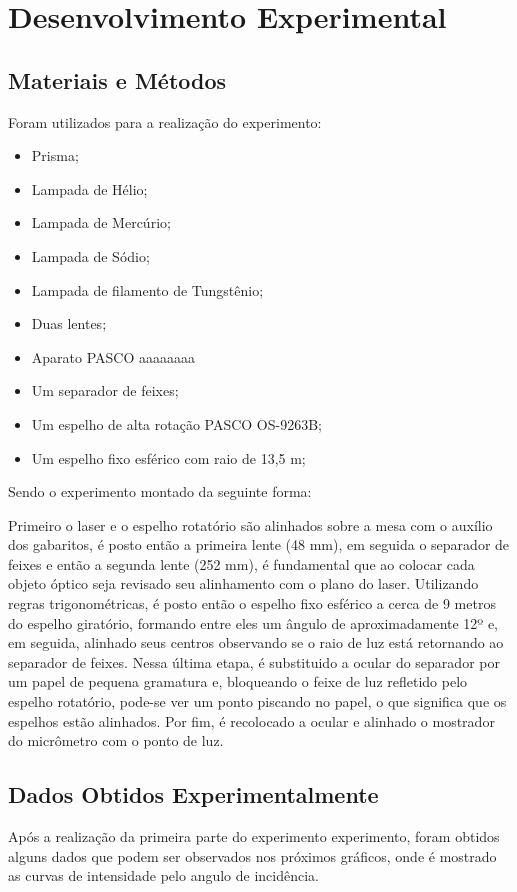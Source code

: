 \section{Desenvolvimento Experimental}
\subsection{Materiais e Métodos}
Foram utilizados para a realização do experimento:
\begin{itemize}
	\item Prisma;
	\item Lampada de Hélio;
	\item Lampada de Mercúrio;
	\item Lampada de Sódio;
	\item Lampada de filamento de Tungstênio;
	\item Duas lentes;
	\item Aparato PASCO aaaaaaaa
	\item Um separador de feixes;
	\item Um espelho de alta rotação PASCO OS-9263B;
	\item Um espelho fixo esférico com raio de 13,5 m;
\end{itemize}
Sendo o experimento montado da seguinte forma:



Primeiro o laser e o espelho rotatório são alinhados sobre a mesa com o auxílio dos gabaritos, é posto então a primeira lente (48 mm), em seguida o separador de feixes e então a segunda lente (252 mm), é fundamental que ao colocar cada objeto óptico seja revisado seu alinhamento com o plano do laser. Utilizando regras trigonométricas, é posto então o espelho fixo esférico a cerca de 9 metros
do espelho giratório, formando entre eles um ângulo de aproximadamente 12º e, em seguida, alinhado seus centros observando  se o raio de luz está retornando ao separador de feixes. Nessa última etapa, é substituido a ocular do separador por um papel de pequena gramatura e, bloqueando o feixe de luz refletido pelo espelho rotatório, pode-se ver um ponto piscando no papel, o que significa que os espelhos estão alinhados. Por fim, é recolocado a ocular e alinhado o mostrador do micrômetro com o ponto de luz.
\subsection{Dados Obtidos Experimentalmente}
Após a realização da primeira parte do experimento experimento, foram obtidos alguns dados que podem ser observados nos próximos gráficos, onde é mostrado as curvas de intensidade pelo angulo de incidência.

